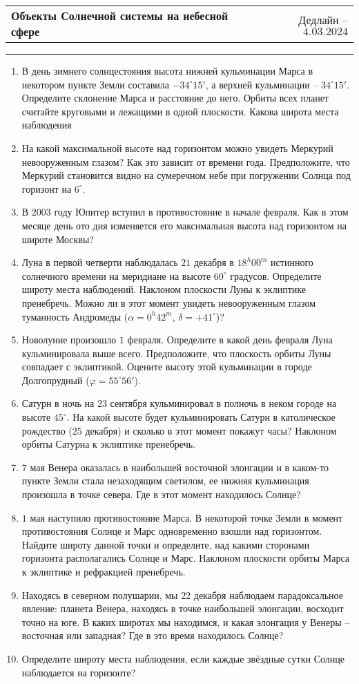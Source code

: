 \documentclass[12pt]{article}
\begin{document}
 \begin{tabularx}{\textwidth}{Xr}
  {\Large \textbf{Объекты Солнечной системы на небесной сфере}} & Дедлайн -- $4.03.2024$ \\
 \end{tabularx}
 \noindent\rule{\textwidth}{0.4pt}
 \begin{enumerate}
        \item В день зимнего солнцестояния высота нижней кульминации Марса в некотором пункте Земли составила $-34^{\circ}15'$, а верхней кульминации -- $34^{\circ}15'$. Определите склонение Марса и расстояние до него. Орбиты всех планет считайте круговыми и лежащими в одной плоскости. Какова широта места наблюдения
        \item На какой максимальной высоте над горизонтом можно увидеть Меркурий невооруженным глазом? Как это зависит от времени года. Предположите, что Меркурий становится видно на сумеречном небе при погружении Солнца под горизонт на $6^{\circ}$.
        \item В $2003$ году Юпитер вступил в противостояние в начале февраля. Как в этом месяце день ото дня изменяется его максимальная высота над горизонтом на широте Москвы?
        \item Луна в первой четверти наблюдалась $21$ декабря в $18^h 00^m$ истинного солнечного времени на меридиане на высоте $60^{\circ}$ градусов. Определите широту места наблюдений. Наклоном плоскости Луны к эклиптике пренебречь. Можно ли в этот момент увидеть невооруженным глазом туманность Андромеды ($\alpha=0^h 42^m$, $\delta=+41^{\circ}$)?
        \item Новолуние произошло $1$ февраля. Определите в какой день февраля Луна кульминировала выше всего. Предположите, что плоскость орбиты Луны совпадает с эклиптикой. Оцените высоту этой кульминации в городе Долгопрудный ($\varphi=55^{\circ}56'$).
        \item Сатурн в ночь на $23$ сентября кульминировал в полночь в неком городе на высоте $45^{\circ}$. На какой высоте будет кульминировать Сатурн в католическое рождество ($25$ декабря) и сколько в этот момент покажут часы? Наклоном орбиты Сатурна к эклиптике пренебречь.
        \item $7$ мая Венера оказалась в наибольшей восточной элонгации и в каком-то пункте Земли стала незаходящим светилом, ее нижняя кульминация произошла в точке севера. Где в этот момент находилось Солнце?
        \item $1$ мая наступило противостояние Марса. В некоторой точке Земли в момент противостояния Солнце и Марс одновременно взошли над горизонтом. Найдите широту данной точки и определите, над какими сторонами горизонта располагались Солнце и Марс. Наклоном плоскости орбиты Марса к эклиптике и рефракцией пренебречь.
        \item Находясь в северном полушарии, мы $22$ декабря наблюдаем парадоксальное явление: планета Венера, находясь в точке наибольшей элонгации, восходит точно на юге. В каких широтах мы находимся, и какая элонгация у Венеры -- восточная или западная? Где в это время находилось Солнце?
        \item Определите широту места наблюдения, если каждые звёздные сутки Солнце наблюдается на горизонте?
 \end{enumerate}
\end{document}
